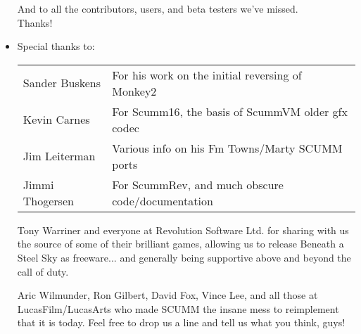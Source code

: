 \begin{itemize}
And to all the contributors, users, and beta testers we've missed.\\
Thanks!
\item Special thanks to:\\
  \begin{tabular}{ll}
    Sander Buskens  & For his work on the initial reversing of Monkey2\\
    Kevin Carnes    & For Scumm16, the basis of ScummVM older gfx codec\\
    Jim Leiterman   & Various info on his Fm Towns/Marty SCUMM ports\\
    Jimmi Thogersen & For ScummRev, and much obscure code/documentation\\
  \end{tabular}
  
  Tony Warriner and everyone at Revolution Software Ltd. for sharing
  with us the source of some of their brilliant games, allowing us to
  release Beneath a Steel Sky as freeware... and generally being
  supportive above and beyond the call of duty.

  Aric Wilmunder, Ron Gilbert, David Fox, Vince Lee, and all those at
  LucasFilm/LucasArts who made SCUMM the insane mess to reimplement
  that it is today. Feel free to drop us a line and tell us what you
  think, guys!
\end{itemize}
